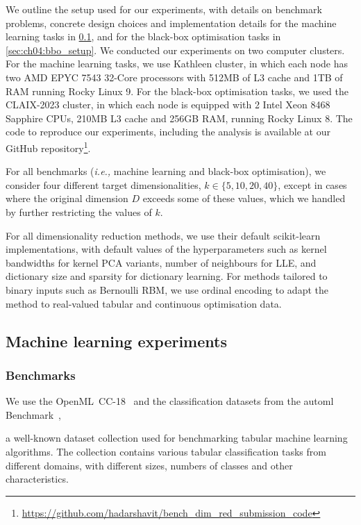 We outline the setup used for our experiments, with details on benchmark problems, concrete design choices and implementation details for the machine learning tasks in \cref{sec:ch04:ml_setup}, and for the  black-box optimisation tasks in \cref{sec:ch04:bbo_setup}.
We conducted our experiments on two computer clusters.
For the machine learning tasks, we use Kathleen cluster, in which each node has two AMD EPYC 7543 32-Core processors with 512MB of L3 cache and 1TB of RAM running Rocky Linux 9.
For the black-box optimisation tasks, we used the CLAIX-2023 cluster, in which each node is equipped with 2 Intel Xeon 8468 Sapphire CPUs, 210MB L3 cache and 256GB RAM, running Rocky Linux 8. The code to reproduce our experiments, including the analysis is available at our GitHub repository\footnote{\url{https://github.com/hadarshavit/bench_dim_red_submission_code}}.

For all benchmarks (\emph{i.e.,} machine learning and black-box optimisation), we consider four different target dimensionalities, $k \in \{ 5, 10, 20, 40\}$, except in cases where the original dimension 
$D$ exceeds some of these values, which we handled by further restricting the values of $k$.


For all dimensionality reduction methods, we use their default scikit-learn~\citep{PedEtAl11} implementations, with default values of the hyperparameters such as kernel bandwidths for kernel PCA variants, number of neighbours for LLE, and dictionary size and sparsity for dictionary learning.
For methods tailored to binary inputs such as Bernoulli RBM, we use ordinal encoding to adapt the method to real-valued tabular and continuous optimisation data.




\subsection{Machine learning experiments}
\label{sec:ch04:ml_setup}

\subsubsection*{Benchmarks}

We use the OpenML~CC-18~\citep{BisEtAl21} and the classification datasets from the \gls{automl} Benchmark~\citep{GijEtAl24}, 

a well-known dataset collection used for benchmarking tabular machine learning algorithms. The collection contains various tabular classification tasks from different domains, with different sizes, numbers of classes and other characteristics. 


